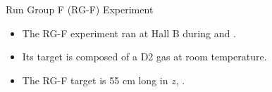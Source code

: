 \begin{frame}{Run Group F (RG-F) Experiment}
    \label{10.41::rgf_experiment}

    \begin{itemize}
        \item
            The RG-F experiment ran at Hall B during  and .

        \item
            Its target is composed of a D2 gas at room temperature.

        \item
            The RG-F target is 55 cm long in $z$, .
    \end{itemize}

\end{frame}
